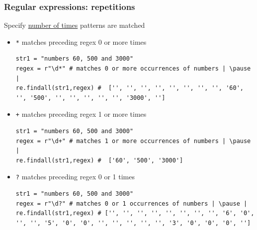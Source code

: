 \documentclass[xcolor=table]{beamer}
\begin{document}

\begin{frame}[fragile]
    \frametitle{Regular expressions: repetitions}
    Specify \href{https://docs.python.org/3.7/library/re.html#regular-expression-syntax}{number of times} patterns are matched
    \begin{itemize} \pause
        \item\texttt{*} matches preceding regex 0 or more times \pause
\begin{lstlisting}[style=python,belowskip=-1.5 \baselineskip]
str1 = "numbers 60, 500 and 3000"
regex = r"\d*" # matches 0 or more occurrences of numbers | \pause |  
re.findall(str1,regex) #  ['', '', '', '', '', '', '', '', '60', '', '500', '', '', '', '', '', '3000', '']
\end{lstlisting} \pause
        \item\texttt{+} matches preceding regex 1 or more times \pause
\begin{lstlisting}[style=python,belowskip=-1.5 \baselineskip]
str1 = "numbers 60, 500 and 3000"
regex = r"\d+" # matches 1 or more occurrences of numbers | \pause |  
re.findall(str1,regex) #  ['60', '500', '3000']
\end{lstlisting} \pause
        \item\texttt{?} matches preceding regex 0 or 1 times \pause
\begin{lstlisting}[style=python,belowskip=-1.5 \baselineskip]
str1 = "numbers 60, 500 and 3000"
regex = r"\d?" # matches 0 or 1 occurrences of numbers | \pause |  
re.findall(str1,regex) # ['', '', '', '', '', '', '', '', '6', '0', '', '', '5', '0', '0', '', '', '', '', '', '3', '0', '0', '0', '']
\end{lstlisting} 
    \end{itemize}
\end{frame}
\end{document}
